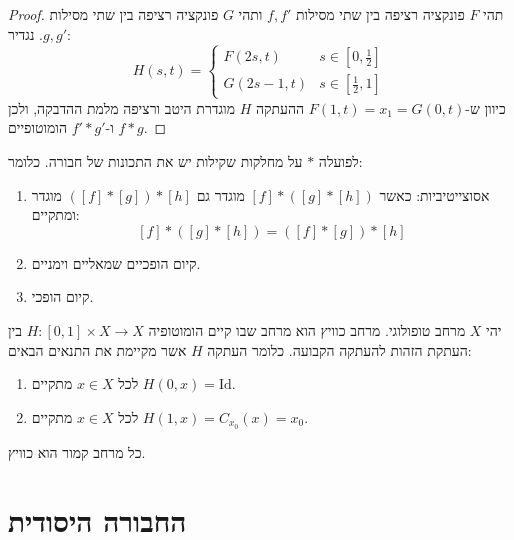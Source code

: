 \documentclass{tstextbook}
\begin{document}
\begin{proof}
תהי \(F\) פונקציה רציפה בין שתי מסילות \(f,f'\) ותהי \(G\) פונקציה רציפה בין שתי מסילות \(g,g'\). נגדיר:
$$H(s,t)=\begin{cases}F(2s,t) & s \in \left[ 0,\frac{1}{2} \right] \\G(2s-1,t) & s \in \left[ \frac{1}{2},1 \right]
\end{cases}$$
כיוון ש-\(F(1,t)=x_{1}=G(0,t)\) ההעתקה \(H\) מוגדרת היטב ורציפה מלמת ההדבקה, ולכן \(f*g\) ו-\(f'*g'\) הומוטופיים.

\end{proof}
\begin{proposition}
לפועלה \(*\) על מחלקות שקילות יש את התכונות של חבורה. כלומר:

  \begin{enumerate}
    \item אסוצייטיביות: כאשר \([f]*([g]*[h])\) מוגדר גם \(([f]*[g])*[h]\) מוגדר ומתקיים: 
$$[f]*([g]*[h])=([f]*[g])*[h]$$


    \item קיום הופכיים שמאליים וימניים. 


    \item קיום הופכי. 


  \end{enumerate}
\end{proposition}
\begin{definition}
יהי \(X\) מרחב טופולוגי. מרחב כוויץ הוא מרחב שבו קיים הומוטופיה \(H:[0,1]\times X\to X\) בין העתקת הזהות להעתקה הקבועה. כלומר העתקה \(H\) אשר מקיימת את התנאים הבאים:

  \begin{enumerate}
    \item לכל \(x \in X\) מתקיים \(H(0,x)=\mathrm{Id}\). 


    \item לכל \(x \in X\) מתקיים \(H(1,x)=C_{x_{0}}(x)=x_{0}\). 


  \end{enumerate}
\end{definition}
\begin{example}
כל מרחב קמור הוא כוויץ.

\end{example}
\section{החבורה היסודית}
\end{document}
